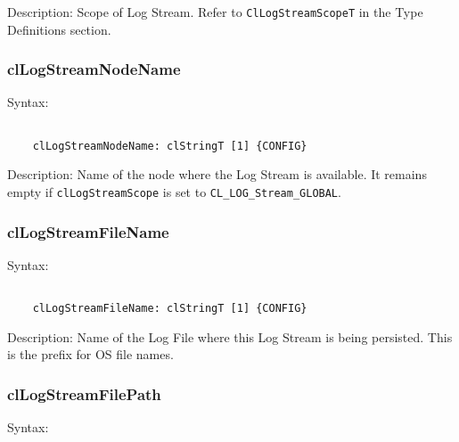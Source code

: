 \begin{flushleft}
\begin{Desc}
 \item[Description:]
Scope of Log Stream. Refer to {\tt{ClLogStreamScopeT}} in the Type Definitions section.
\end{Desc}


\subsubsection{clLogStreamNodeName}
\begin{Desc}
\item[Syntax:]
\footnotesize\begin{verbatim}        	

	clLogStreamNodeName: clStringT [1] {CONFIG}
	\end{verbatim}
	\normalsize
\end{Desc}

\begin{Desc}
 \item[Description:]
Name of the node where the Log Stream is available. It remains empty if {\tt{clLogStreamScope}} is set to 
{\tt{CL\_\-LOG\_\-Stream\_\-GLOBAL}}.
\end{Desc}


\subsubsection{clLogStreamFileName}
\begin{Desc}
\item[Syntax:]
\footnotesize\begin{verbatim}        	

	clLogStreamFileName: clStringT [1] {CONFIG}
	\end{verbatim}
	\normalsize
\end{Desc}

\begin{Desc}
 \item[Description:]
Name of the Log File where this Log Stream is being persisted. This is the prefix for OS file names.
\end{Desc}


\subsubsection{clLogStreamFilePath}
\begin{Desc}
\item[Syntax:]
\footnotesize\begin{verbatim}        	


\end{verbatim}
\end{Desc}
\end{flushleft}
